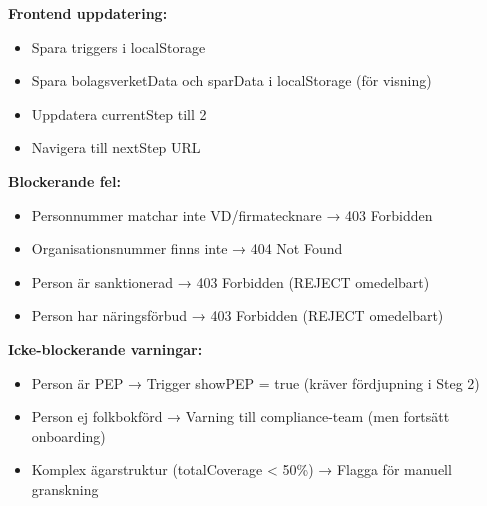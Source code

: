 \textbf{Frontend uppdatering:}
\begin{itemize}[noitemsep]
  \item Spara triggers i localStorage
  \item Spara bolagsverketData och sparData i localStorage (för visning)
  \item Uppdatera currentStep till 2
  \item Navigera till nextStep URL
\end{itemize}

\textbf{Blockerande fel:}
\begin{itemize}[noitemsep]
  \item Personnummer matchar inte VD/firmatecknare → 403 Forbidden
  \item Organisationsnummer finns inte → 404 Not Found
  \item Person är sanktionerad → 403 Forbidden (REJECT omedelbart)
  \item Person har näringsförbud → 403 Forbidden (REJECT omedelbart)
\end{itemize}

\textbf{Icke-blockerande varningar:}
\begin{itemize}[noitemsep]
  \item Person är PEP → Trigger showPEP = true (kräver fördjupning i Steg 2)
  \item Person ej folkbokförd → Varning till compliance-team (men fortsätt onboarding)
  \item Komplex ägarstruktur (totalCoverage < 50\%) → Flagga för manuell granskning
\end{itemize}
